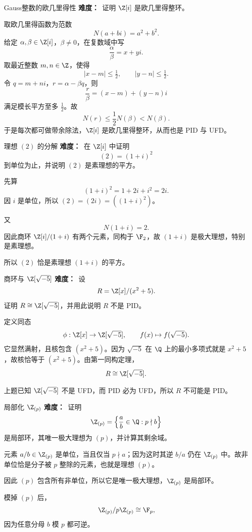 \begin{problem}{Gauss整数的欧几里得性}
\textbf{难度：}\easy\ 证明 $\Z[i]$ 是欧几里得整环。
\end{problem}
\begin{solution}
取欧几里得函数为范数
\[
N(a+bi)=a^2+b^2.
\]
给定 $\alpha,\beta\in\Z[i]$，$\beta\neq0$，在复数域中写
\[
\frac\alpha\beta=x+yi.
\]
取最近整数 $m,n\in\Z$，使得
\[
|x-m|\le\tfrac12,\qquad |y-n|\le\tfrac12.
\]
令 $q=m+ni$，$r=\alpha-\beta q$，则
\[
\frac r\beta=(x-m)+(y-n)i
\]
满足模长平方至多 $\frac12$。故
\[
N(r)\le \frac12 N(\beta)<N(\beta).
\]
于是每次都可做带余除法，$\Z[i]$ 是欧几里得整环，从而也是 PID 与 UFD。
\end{solution}

\begin{problem}{理想 $(2)$ 的分解}
\textbf{难度：}\medium\ 在 $\Z[i]$ 中证明
\[
(2)=(1+i)^2
\]
到单位为止，并说明 $(2)$ 是素理想的平方。
\end{problem}
\begin{solution}
先算
\[
(1+i)^2=1+2i+i^2=2i.
\]
因 $i$ 是单位，所以 $(2)=(2i)=((1+i)^2)$。

又
\[
N(1+i)=2.
\]
因此商环 $\Z[i]/(1+i)$ 有两个元素，同构于 $\F_2$，故 $(1+i)$ 是极大理想，特别是素理想。

所以 $(2)$ 恰是素理想 $(1+i)$ 的平方。
\end{solution}

\begin{problem}{商环与 $\Z[\sqrt{-5}]$}
\textbf{难度：}\medium\ 设
\[
R=\Z[x]/(x^2+5).
\]
证明 $R\cong\Z[\sqrt{-5}]$，并用此说明 $R$ 不是 PID。
\end{problem}
\begin{solution}
定义同态
\[
\phi:\Z[x]\to \Z[\sqrt{-5}],\qquad f(x)\mapsto f(\sqrt{-5}).
\]
它显然满射，且核包含 $(x^2+5)$。因为 $\sqrt{-5}$ 在 $\Q$ 上的最小多项式就是 $x^2+5$，故核恰等于 $(x^2+5)$。由第一同构定理，
\[
R\cong \Z[\sqrt{-5}].
\]

上题已知 $\Z[\sqrt{-5}]$ 不是 UFD，而 PID 必为 UFD，所以 $R$ 不可能是 PID。
\end{solution}

\begin{problem}{局部化 $\Z_{(p)}$}
\textbf{难度：}\medium\ 证明
\[
\Z_{(p)}=\left\{\frac ab\in\Q:p\nmid b\right\}
\]
是局部环，其唯一极大理想为 $(p)$，并计算其剩余域。
\end{problem}
\begin{solution}
元素 $a/b\in\Z_{(p)}$ 是单位，当且仅当 $p\nmid a$；因为这时其逆 $b/a$ 仍在 $\Z_{(p)}$ 中。故非单位恰是分子被 $p$ 整除的元素，也就是理想 $(p)$。

因此 $(p)$ 包含所有非单位，所以它是唯一极大理想，$\Z_{(p)}$ 是局部环。

模掉 $(p)$ 后，
\[
\Z_{(p)}/p\Z_{(p)}\cong \F_p,
\]
因为任意分母 $b$ 模 $p$ 都可逆。
\end{solution}

